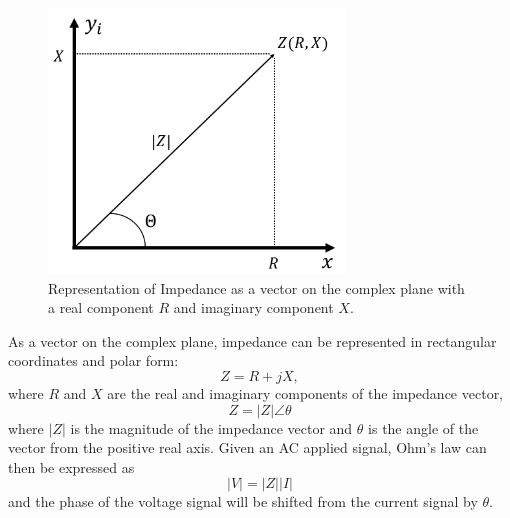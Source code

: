  \begin{figure}[ht]
 \centering
 \includegraphics[width=0.7\textwidth]{images/impdedanceDiagram.png}
 \caption[Representation of Impedance as a vector on the complex plane]{Representation of Impedance as a vector on the complex plane with a real component $R$ and imaginary component $X$. }
 \label{fig:Impedance_diagram}
 \end{figure}
 
 \par As a vector on the complex plane, impedance can be represented in rectangular coordinates and polar form:
 \begin{equation}
    Z = R + jX,
 \end{equation}
 \noindent where $R$ and $X$ are the real and imaginary components of the impedance vector, 
 \begin{equation}
     Z = |Z| \angle \theta
     \label{eqn:z_polar}
 \end{equation}
 \noindent where $|Z|$ is the magnitude of the impedance vector and $\theta$ is the angle of the vector from the positive real axis. Given an AC applied signal, Ohm's law can then be expressed as
 \begin{equation}
    |V| = |Z||I|
    \label{eqn:ohm_mag}
 \end{equation}
 \noindent and the phase of the voltage signal will be shifted from the current signal by $\theta$. 
 
